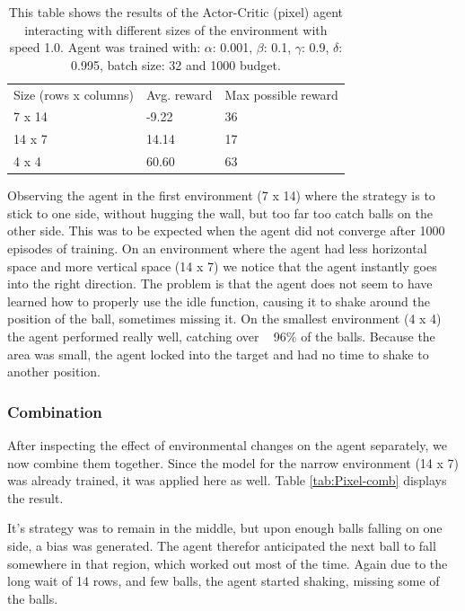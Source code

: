 \documentclass{article}
\begin{document}
\begin{table}[]
\begin{tabular}{lll}
Size (rows x columns) & Avg. reward & Max possible reward \\
7 x 14                & -9.22       & 36                  \\
14 x 7                & 14.14       & 17                  \\
4 x 4                 & 60.60       & 63                 
\end{tabular}
\caption{This table shows the results of the Actor-Critic (pixel) agent interacting with different sizes of the environment with speed 1.0. 
Agent was trained with: $\alpha$: 0.001, $\beta$: 0.1, $\gamma$: 0.9, $\delta$: 0.995, batch size: 32 and 1000 budget. }
\label{tab:Pixel-size}
\end{table}

Observing the agent in the first environment (7 x 14)  where the strategy is to stick to one side, without hugging the wall, but too far too catch balls on the other side. 
This was to be expected when the agent did not converge after 1000 episodes of training. 
On an environment where the agent had less horizontal space and more vertical space (14 x 7) we notice that the agent instantly goes into the right direction.
The problem is that the agent does not seem to have learned how to properly use the idle function, causing it to shake around the position of the ball, sometimes missing it. 
On the smallest environment (4 x 4) the agent performed really well, catching over ~ 96\% of the balls.
Because the area was small, the agent locked into the target and had no time to shake to another position.


\subsubsection{Combination}
After inspecting the effect of environmental changes on the agent separately, we now combine them together. 
Since the model for the narrow environment (14 x 7) was already trained, it was applied here as well. 
Table \ref{tab:Pixel-comb} displays the result.

It's strategy was to remain in the middle, but upon enough balls falling on one side, a bias was generated. 
The agent therefor anticipated the next ball to fall somewhere in that region, which worked out most of the time.
Again due to the long wait of 14 rows, and few balls, the agent started shaking, missing some of the balls. 
\end{document}
